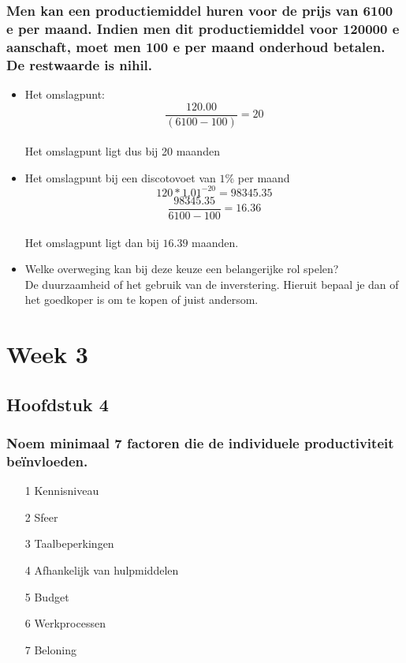 \documentclass[a4paper,titlepage]{artikel1}
\begin{document}
   \subsubsection[Opdracht 5]{Men kan een productiemiddel huren voor de
   prijs van 6100 e per maand. Indien men dit productiemiddel voor
   120000 e aanschaft, moet men 100 e per maand onderhoud betalen. De
   restwaarde is nihil.}
    \begin{itemize}
     \item Het omslagpunt:
	   \begin{displaymath}
	    \frac{120.00}{(6100-100)}=20
	   \end{displaymath}
	   \\Het omslagpunt ligt dus bij 20 maanden
     \item Het omslagpunt bij een discotovoet van $1\%$ per maand
	   \begin{displaymath}
	    120*1.01^{-20}=98345.35
	   \end{displaymath}
	   \begin{displaymath}
	    \frac{98345.35}{6100-100}=16.36
	   \end{displaymath}
	   \\Het omslagpunt ligt dan bij $16.39$ maanden.
     \item Welke overweging kan bij deze keuze een belangerijke rol spelen?\\De duurzaamheid of het gebruik van de inverstering. Hieruit bepaal je dan of het goedkoper is om te kopen of juist andersom.
    \end{itemize}
    
 \section{Week 3}
  \subsection{Hoofdstuk 4}
   \subsubsection[Opdracht 1]{Noem minimaal 7 factoren die de individuele productiviteit be\"invloeden.}
   \begin{itemize}
    \item[1] Kennisniveau
    \item[2] Sfeer
    \item[3] Taalbeperkingen
    \item[4] Afhankelijk van hulpmiddelen
    \item[5] Budget
    \item[6] Werkprocessen
    \item[7] Beloning
   \end{itemize}
   
\end{document}
